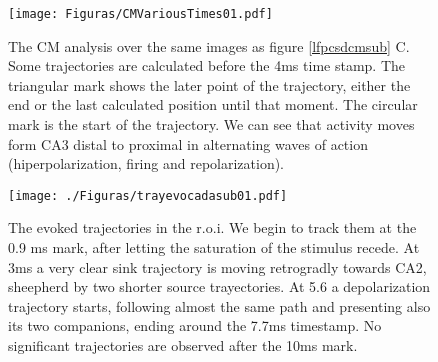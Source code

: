 \documentclass[12pt]{article}
\begin{document}



\begin{figure}
 \texttt{[image: Figuras/CMVariousTimes01.pdf]}
  \caption{ The CM analysis over the same images as figure \ref{lfpcsdcmsub} C. Some trajectories
    are calculated before the 4ms time stamp. The triangular mark shows the later point of the
    trajectory, either the end or the last calculated position until that moment. The circular
    mark is the start of the trajectory. We can see that activity moves form CA3 distal to
    proximal in alternating waves of action (hiperpolarization, firing and repolarization).
  }\label{cmevocada}
\end{figure} 



\begin{figure}
  \texttt{[image: ./Figuras/trayevocadasub01.pdf]}
  \caption{The evoked trajectories in the r.o.i. We begin to track them
    at the 0.9 ms mark, after letting the saturation of the stimulus recede.
    At 3ms a very clear sink trajectory is moving retrogradly towards CA2,
    sheepherd by two shorter source trayectories. At 5.6 a depolarization
    trajectory starts, following almost the same path and presenting also its
    two companions, ending around the 7.7ms timestamp. No significant
  trajectories are observed after the 10ms mark. }\label{trayevo}
\end{figure}
\end{document}
